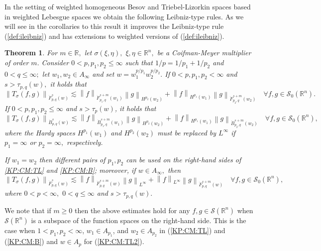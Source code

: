 \documentclass[10pt,a4paper]{article}
\newtheorem{theorem}{Theorem}[section]
\theoremstyle{remark}
\newcommand{\re}{\mathbb{R}}
\newcommand{\rn}{{{\mathbb R}^n}}
\newcommand{\sw}{{\mathcal{S}}(\rn)}
\newcommand{\swz}{{\mathcal{S}_0}(\rn)}
\newcommand{\tlw}[4]{\dot F_{#1,#3}^{#2}(#4)} %
\newcommand{\besw}[4]{\dot B_{#1,#3}^{#2}(#4)} %
\newcommand{\norm}[2]{\left\|#1\right\|_{#2}}
\newcommand{\hcline}{1/p=1/p_1+1/p_2}
\begin{document}
 In the setting of weighted homogeneous Besov and Triebel-Lizorkin spaces based in weighted Lebesgue spaces we obtain the following Leibniz-type rules. As we will see in the corollaries to this result it improves the Leibniz-type rule (\ref{def:ileibniz}) and has extensions to weighted versions of (\ref{def:ileibniz}).
  
  \begin{theorem}\label{thm:CM:TL:B}  For $m \in \re,$ let $\sigma(\xi,\eta),$ $\xi,\eta\in\rn,$ be a Coifman-Meyer multiplier of order $m.$ Consider  $0 < p, p_1, p_2  \le \infty$  such that $\hcline$ and  $0 < q \leq \infty;$ let  $w_1,w_2\in A_\infty$ and set $w=w_1^{{p}/{p_1}} w_2^{{p}/{p_2}}.$ 
If $0 < p,p_1,p_2 < \infty$ and  $s > \tau_{p,q}(w),$  it holds that
\begin{equation}\label{KP:CM:TL}
\norm{T_\sigma(f,g)}{\tlw{p}{s}{q}{w}} \lesssim \norm{f}{\tlw{p_1}{s+m}{q}{w_1} } \norm{g}{H^{p_2}(w_2)} +  \norm{f}{H^{p_1}(w_1)}   \norm{g}{\tlw{p_2}{s+m}{q}{w_2} } \quad \forall f, g \in \swz.
\end{equation}
If $0< p, p_1,p_2\leq \infty$ and $s > \tau_p(w)$, it holds that
\begin{equation}\label{KP:CM:B}
\norm{T_\sigma(f,g)}{\besw{p}{s}{q}{w}} \lesssim \norm{f}{\besw{p_1}{s+m}{q}{w_1} } \norm{g}{H^{p_2}(w_2)} +  \norm{f}{H^{p_1}(w_1)}   \norm{g}{\besw{p_2}{s+m}{q}{w_2} } \quad \forall f, g \in \swz,
\end{equation}
where the Hardy spaces $H^{p_1}(w_1)$ and $H^{p_2}(w_2)$ must be replaced by $L^\infty$ if $p_1=\infty$ or $p_2=\infty,$ respectively.

If $w_1=w_2$ then different pairs of $p_1, p_2$ can be used on the right-hand sides of \eqref{KP:CM:TL} and \eqref{KP:CM:B}; moreover, if $w\in A_\infty,$ then 
\begin{equation}\label{KP:CM:TL2}
\norm{T_\sigma(f,g)}{\tlw{p}{s}{q}{w}} \lesssim \norm{f}{\tlw{p}{s+m}{q}{w} } \norm{g}{L^\infty} +  \norm{f}{L^\infty}   \norm{g}{\tlw{p}{s+m}{q}{w}} \quad \forall f, g \in \swz,
\end{equation}
where $0<p<\infty,$ $0<q\le\infty$ and $s>\tau_{p,q}(w).$
\end{theorem}

We note that if $m\geq 0$ then the above estimates hold for any $f,g\in\sw$ when $\sw$ is a subspace of the function spaces on the right-hand side. This is the case when $1<p_1,p_2<\infty$, $w_1\in A_{p_1}$, and $w_2\in A_{p_2}$ in (\ref{KP:CM:TL}) and (\ref{KP:CM:B}) and $w\in A_p$ for (\ref{KP:CM:TL2}). 
\end{document}
